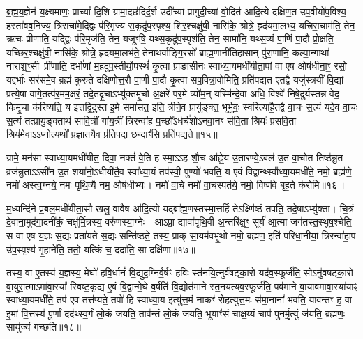 ब्र॒ह्म॒य॒ज्ञेन॑ य॒क्ष्यमा॑णः॒ प्राच्यां᳚ दि॒शि ग्रामा॒दछ॑दिर्द॒र्\mbox{}श उदी᳚च्यां प्रागुदी॒च्यां वो॒दित॑ आदि॒त्ये द॑क्षिण॒त उ॑प॒वीयो॑प॒विश्य॒ हस्ता॑वव॒निज्य॒ त्रिराचा॑मे॒द्द्विः प॑रि॒मृज्य॑ स॒कृदु॑प॒स्पृश्य॒ शिर॒श्चक्षु॑षी॒ नासि॑के॒ श्रोत्रे॒ हृद॑यमा॒लभ्य॒ यत्त्रिरा॒चाम॑ति॒ तेन॒ ऋचः॑ प्रीणाति॒ यद्द्विः प॑रि॒मृज॑ति॒ तेन॒ यजूꣳ॑षि॒ यथ्स॒कृदु॑प॒स्पृश॑ति॒ तेन॒ सामा॑नि॒ यथ्स॒व्यं पा॒णिं पा॒दौ प्रो॒क्षति॒ यच्छिर॒श्चक्षु॑षी॒ नासि॑के॒ श्रोत्रे॒ हृद॑यमा॒लभ॑ते॒ तेनाथ॑र्वाङ्गि॒रसो᳚ ब्राह्म॒णानी॑तिहा॒सान् पु॑रा॒णानि॒ कल्पा॒न्गाथा॑ नाराश॒ꣳ॒सीः प्री॑णाति॒ दर्भा॑णां म॒हदु॑प॒स्तीर्यो॒पस्थं॑ कृ॒त्वा प्राङासी॑नः स्वाध्या॒यमधी॑यीता॒पां वा ए॒ष ओष॑धीना॒ꣳ॒ रसो॒ यद्द॒र्भाः सर॑समे॒व ब्रह्म॑ कुरुते दक्षिणोत्त॒रौ पा॒णी पा॒दौ कृ॒त्वा सप॒वित्रा॒वोमिति॒ प्रति॑पद्यत ए॒तद्वै यजु॑स्त्रयीं वि॒द्यां प्रत्ये॒षा वागे॒तत्प॑र॒मम॒क्षरं॒ तदे॒तदृ॒चाऽभ्यु॑क्तमृ॒चो अ॒क्षरे॑ पर॒मे व्यो॑म॒न् यस्मि॑न्दे॒वा अधि॒ विश्वे॑ निषे॒दुर्यस्तन्न वेद॒ किमृ॒चा क॑रिष्यति॒ य इत्तद्वि॒दुस्त इ॒मे समा॑सत॒ इति॒ त्रीने॒व प्रायु॑ङ्क्त॒ भूर्भुवः॒ स्व॑रित्या॑है॒तद्वै वा॒चः स॒त्यं यदे॒व वा॒चः स॒त्यं तत्प्रायु॒ङ्क्ताथ॑ सावि॒त्रीं गा॑य॒त्रीं त्रिरन्वा॑ह प॒च्छो᳚ऽर्धर्च॑शोऽनवा॒नꣳ स॑वि॒ता श्रियः॑ प्रसवि॒ता श्रिय॑मे॒वाऽऽप्नो॒त्यथो᳚ प्र॒ज्ञात॑यै॒व प्र॑ति॒पदा॒ छन्दाꣳ॑सि॒ प्रति॑पद्यते॥१५॥\anuvakamend


ग्रामे॒ मन॑सा स्वाध्या॒यमधी॑यीत॒ दिवा॒ नक्तं॑ वे॒ति ह॑ स्मा॒ऽऽह शौ॒च आ᳚ह्ने॒य उ॒तार॑ण्ये॒ऽबल॑ उ॒त वा॒चोत तिष्ठ॑न्नु॒त व्रज॑न्नु॒ताऽऽसी॑न उ॒त शया॑नो॒ऽधीयी॑तै॒व स्वा᳚ध्या॒यं तप॑स्वी॒ पुण्यो॑ भवति॒ य ए॒वं विद्वान्थ्स्वा᳚᳚ध्या॒यमधी॑ते॒ नमो॒ ब्रह्म॑णे॒ नमो॑ अस्त्व॒ग्नये॒ नमः॑ पृथि॒व्यै नम॒ ओष॑धीभ्यः। 
नमो॑ वा॒चे नमो॑ वा॒चस्पत॑ये॒ नमो॒ विष्ण॑वे बृह॒ते क॑रोमि॥१६॥
\anuvakamend


म॒ध्यन्दि॑ने प्र॒बल॒मधी॑यीता॒सौ खलु॒ वावैष आ॑दि॒त्यो यद्ब्रा᳚ह्म॒ण\-स्तस्मा॒त्तर्\mbox{}हि॒ तेऽक्ष्णि॑ष्ठं तपति॒ तदे॒षाऽभ्यु॑क्ता। 
चि॒त्रं दे॒वाना॒मुद॑गा॒\-दनी॑कं॒ चक्षु॑र्मि॒त्रस्य॒ वरु॑णस्या॒ग्नेः। 
आऽप्रा॒ द्यावा॑पृथि॒वी अ॒न्तरि॑क्ष॒ꣳ॒ सूर्य॑ आ॒त्मा जग॑तस्त॒स्थुष॒श्चेति॒ स वा ए॒ष य॒ज्ञः स॒द्यः प्रता॑यते स॒द्यः सन्ति॑ष्ठते॒ तस्य॒ प्राक् सा॒यम॑वभृ॒थो नमो॒ ब्रह्म॑ण॒ इति॑ परिधा॒नीयां॒ त्रिरन्वा॑हा॒प उ॑प॒स्पृश्य॑ गृ॒हाने॑ति॒ ततो॒ यत्किं च॒ ददा॑ति॒ सा दक्षि॑णा॥१७॥\anuvakamend


तस्य॒ वा ए॒तस्य॑ य॒ज्ञस्य॒ मेघो॑ हवि॒र्धानं॑ वि॒द्युद॒ग्निर्\mbox{}व॒र्\mbox{}षꣳ ह॒विः स्त॑नयि॒त्नुर्व॑षट्का॒रो यद॑व॒स्फूर्ज॑ति॒ सोऽनु॑वषट्का॒रो वा॒युरा॒त्माऽमा॑वा॒स्या᳚ स्विष्ट॒कृद्य ए॒वं वि॒द्वान्मे॒घे व॒र्\mbox{}षति॑ वि॒द्योत॑माने स्त॒नय॑त्यव॒स्फूर्ज॑ति॒ पव॑माने वा॒याव॑मावा॒स्या॑याꣴ स्वाध्या॒यमधी॑ते॒ तप॑ ए॒व तत्त॑प्यते॒ तपो॑ हि स्वाध्या॒य इत्यु॑त्त॒मं नाकꣳ॑ रोहत्युत्त॒मः स॑मा॒नानां᳚ भवति॒ याव॑न्तꣳ ह॒ वा इ॒मां वि॒त्तस्य॑ पू॒र्णां दद॑थ्स्व॒र्गं लो॒कं ज॑यति॒ ताव॑न्तं लो॒कं ज॑यति॒ भूयाꣳ॑सं चाक्ष॒य्यं चाप॑ पुनर्मृ॒त्युं ज॑यति॒ ब्रह्म॑णः॒ सायु॑ज्यं गच्छति॥१८॥\anuvakamend


